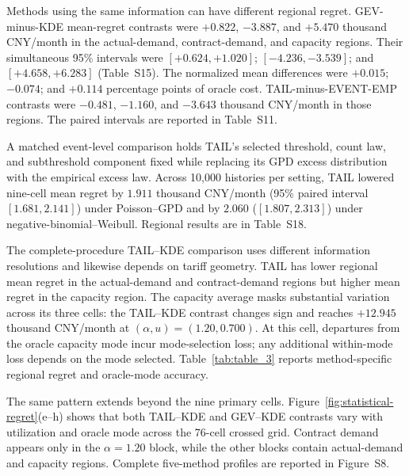 \documentclass[suppldata]{interact}
\begin{document}
Methods using the same information can have different regional regret.
GEV-minus-KDE mean-regret contrasts were $+0.822$, $-3.887$, and $+5.470$ thousand CNY/month in the actual-demand,
contract-demand, and capacity regions. Their simultaneous 95\%
intervals were $[+0.624, +1.020]$; $[-4.236, -3.539]$; and $[+4.658, +6.283]$ (Table~S15). The normalized
mean differences were $+0.015$; $-0.074$; and $+0.114$ percentage points of oracle cost.
TAIL-minus-EVENT-EMP contrasts
were $-0.481$, $-1.160$, and $-3.643$ thousand CNY/month in those regions. The paired
intervals are reported in Table~S11.

A matched event-level comparison holds TAIL's selected threshold,
count law, and subthreshold component fixed while replacing its GPD
excess distribution with the empirical excess law. Across 10,000
histories per setting, TAIL lowered nine-cell mean regret by $1.911$
thousand CNY/month (95\% paired interval $[1.681,2.141]$) under
Poisson--GPD and by $2.060$ ($[1.807,2.313]$) under
negative-binomial--Weibull. Regional results are in Table~S18.

The complete-procedure TAIL--KDE comparison uses different information
resolutions and likewise depends on tariff geometry. TAIL has lower
regional mean regret in the actual-demand
and contract-demand regions but higher mean regret in the capacity
region. The capacity average masks substantial variation across its
three cells: the TAIL--KDE contrast changes sign and reaches
$+12.945$ thousand CNY/month at
$(\alpha,u)=(1.20,0.700)$. At this cell, departures from the oracle capacity mode incur
mode-selection loss; any additional within-mode loss depends on the
mode selected. Table~\ref{tab:table_3} reports method-specific
regional regret and oracle-mode accuracy.

The same pattern extends beyond the nine primary cells.
Figure~\ref{fig:statistical-regret}(e--h) shows that both
TAIL--KDE and GEV--KDE contrasts vary with utilization and oracle mode
across the 76-cell crossed grid. Contract demand appears only in the
$\alpha=1.20$ block, while the other blocks contain actual-demand and
capacity regions. Complete five-method profiles are reported in
Figure~S8.
\end{document}
